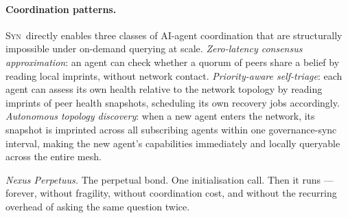 \documentclass[11pt,a4paper]{article}
\newcommand{\SYN}{\textsc{Syn}}
\begin{document}
\paragraph{Coordination patterns.}
\SYN\ directly enables three classes of AI-agent coordination that are
structurally impossible under on-demand querying at scale.
\emph{Zero-latency consensus approximation}: an agent can check whether a
quorum of peers share a belief by reading local imprints, without network
contact.
\emph{Priority-aware self-triage}: each agent can assess its own health
relative to the network topology by reading imprints of peer health snapshots,
scheduling its own recovery jobs accordingly.
\emph{Autonomous topology discovery}: when a new agent enters the network, its
snapshot is imprinted across all subscribing agents within one governance-sync
interval, making the new agent's capabilities immediately and locally queryable
across the entire mesh.

\medskip

\emph{Nexus Perpetuus.}  The perpetual bond.
One initialisation call.  Then it runs --- forever, without fragility, without
coordination cost, and without the recurring overhead of asking the same
question twice.
\end{document}
